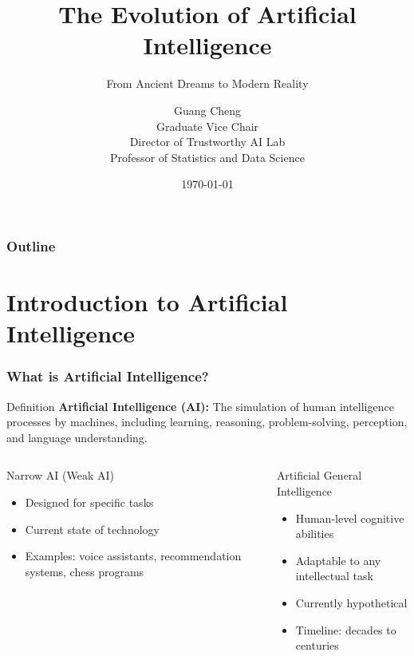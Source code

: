 \documentclass{beamer}
\author{Guang Cheng \\ Graduate Vice Chair \\ Director of Trustworthy AI Lab \\ Professor of Statistics and Data Science}
\title{The Evolution of Artificial Intelligence}
\subtitle{From Ancient Dreams to Modern Reality}
\institute{University of California, Los Angeles}
\date{\today}
\begin{document}
\begin{frame}
    \titlepage
\end{frame}

\begin{frame}
    \frametitle{Outline}
    \tableofcontents
\end{frame}

\section{Introduction to Artificial Intelligence}

\begin{frame}
    \frametitle{What is Artificial Intelligence?}
    \begin{block}{Definition}
        \textbf{Artificial Intelligence (AI):} The simulation of human intelligence processes by machines, including learning, reasoning, problem-solving, perception, and language understanding.
    \end{block}
    
    \begin{columns}
        \begin{column}{0.48\textwidth}
            \begin{alertblock}{Narrow AI (Weak AI)}
                \begin{itemize}
                    \item Designed for specific tasks
                    \item Current state of technology
                    \item Examples: voice assistants, recommendation systems, chess programs
                \end{itemize}
            \end{alertblock}
        \end{column}
        \begin{column}{0.48\textwidth}
            \begin{exampleblock}{Artificial General Intelligence}
                \begin{itemize}
                    \item Human-level cognitive abilities
                    \item Adaptable to any intellectual task
                    \item Currently hypothetical
                    \item Timeline: decades to centuries
                \end{itemize}
            \end{exampleblock}
        \end{column}
    \end{columns}
\end{frame}
\end{document}
